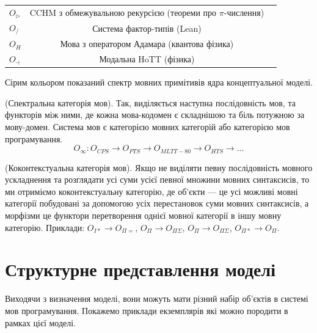 \begin{definition}
\begin{table}
\begin{tabular}{lcc}
      \hline
       $O_{\triangleright}$            & CCHM з обмежувальною рекурсією (теореми про $\pi$-числення)\\
       $O_{/}$                         & Система фактор-типів (Lean) \\
       $O_{H}$                         & Мова з оператором Адамара (квантова фізика)\\
       $O_{\dashv}$                    & Модальна HoTT (фізика)\\
      \hline
  \end{tabular}
  \small Сірим кольором показаний спектр мовних примітивів ядра концептуальної моделі.
\end{table}
\end{definition}

\begin{definition} (Спектральна категорія мов).
Так, виділяється наступна послідовність мов, та функторів між ними,
де кожна мова-кодомен є складнішою та біль потужною за мову-домен.
Система мов є категорією мовних категорій або категорією мов програмування.
\begin{equation}
O_\infty : O_{CPS} \rightarrow O_{PTS} \rightarrow O_{MLTT-80} \rightarrow O_{HTS} \rightarrow ...
\end{equation}
\end{definition}

\begin{definition} (Коконтекстуальна категорія мов).
Якщо не виділяти певну послідовність мовного ускладнення та розглядати
усі суми усієї певної множини мовних синтаксисів, то ми отриміємо коконтекстуальну категорію,
де об'єкти --- це усі можливі мовні категорії побудовані за допомогою усіх перестановок суми мовних синтаксисів,
а морфізми це функтори перетворення однієї мовної категорії в іншу мовну категорію.
Приклади: $O_{I*} \rightarrow O_{\Pi=}$, $O_\Pi \rightarrow O_{\Pi\Sigma}$,
          $O_\Pi \rightarrow O_{\Pi\Sigma}$, $O_{\Pi*} \rightarrow O_\Pi$.
\end{definition}

\section{Структурне представлення моделі}
Виходячи з визначення моделі, вони можуть мати різний
набір об'єктів в системі мов програмування.
Покажемо приклади екземплярів які можно породити в рамках цієї моделі.



